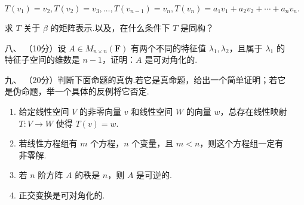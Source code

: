 \begin{enumerate}
    $T(v_1)=v_2,T(v_2)=v_3,\ldots,T(v_{n-1})=v_n,T(v_n)=a_1v_1+a_2v_2+\cdots+a_nv_n.$

    求 $T$ 关于 $\beta$ 的矩阵表示.以及，在什么条件下 $T$ 是同构？
    \item[八、]（10分）设 $A\in M_{n\times n}(\mathbf{F})$ 有两个不同的特征值 $\lambda_1,\lambda_2$，且属于 $\lambda_1$ 的特征子空间的维数是
    $n-1$，证明：$A$ 是可对角化的.
    \item[九、]（20分）判断下面命题的真伪.若它是真命题，给出一个简单证明；若它是伪命题，举一个具体的反例将它否定.
    \begin{enumerate}[label=(\arabic*)]
        \item 给定线性空间 $V$ 的非零向量 $v$ 和线性空间 $W$ 的向量 $w$，总存在线性映射 $T:V\to W$ 使得 $T(v)=w.$
        \item 若线性方程组有 $m$ 个方程，$n$ 个变量，且 $m < n$，则这个方程组一定有非零解.
        \item 若 $n$ 阶方阵 $A$ 的秩是 $n$，则 $A$ 是可逆的.
        \item 正交变换是可对角化的.
    \end{enumerate}
\end{enumerate}

\newpage
